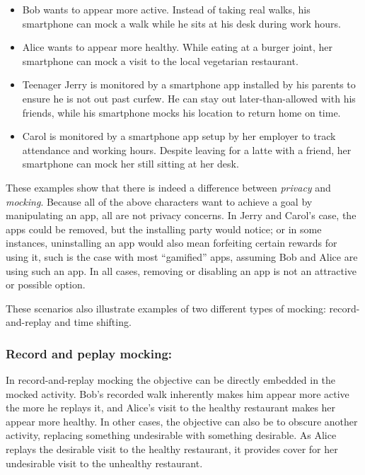 \begin{itemize}

\item Bob wants to appear more active. Instead of taking real walks, his
smartphone can mock a walk while he sits at his desk during work hours.

\item Alice wants to appear more healthy. While eating at a burger joint, her
smartphone can mock a visit to the local vegetarian restaurant.

\item Teenager Jerry is monitored by a smartphone app installed by his parents
to ensure he is not out past curfew. He can stay out later-than-allowed with
his friends, while his smartphone mocks his location to return home on time.

\item Carol is monitored by a smartphone app setup by her employer to track
attendance and working hours. Despite leaving for a latte with a friend, her
smartphone can mock her still sitting at her desk.

\end{itemize}

These examples show that there is indeed a difference between \textit{privacy}
and \textit{mocking}. Because all of the above characters want to achieve a
goal by manipulating an app, all are not privacy concerns. In Jerry and Carol's
case, the apps could be removed, but the installing party would notice; or in
some instances, uninstalling an app would also mean forfeiting certain rewards
for using it, such is the case with most ``gamified'' apps, assuming Bob and
Alice are using such an app. In all cases, removing or disabling an app is not
an attractive or possible option.

These scenarios also illustrate examples of two different types of
mocking: record-and-replay and time shifting.

\subsubsection{Record and peplay mocking:\space}

In record-and-replay mocking the objective can be directly embedded in the
mocked activity. Bob's recorded walk inherently makes him appear more active
the more he replays it, and Alice's visit to the healthy restaurant makes her
appear more healthy. In other cases, the objective can also be to obscure
another activity, replacing something undesirable with something desirable.
As Alice replays the desirable visit to the healthy restaurant, it provides
cover for her undesirable visit to the unhealthy restaurant.

